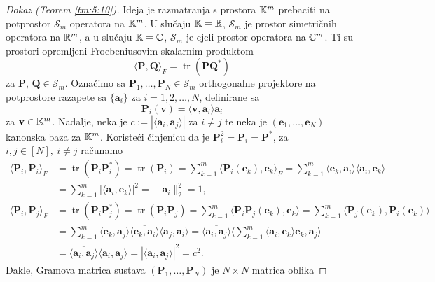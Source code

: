 \documentclass[a4paper,twoside,12pt]{memoir} %
\newcommand{\vect}[1]{\mathbf{#1}}
\renewcommand{\vec}{\vect}
\newcommand{\norm}[1]{\|{#1}\|}
\DeclareMathOperator{\tr}{tr}
\begin{document}
\begin{proof}[Dokaz (Teorem \ref{tm:5:10})]
    Ideja je razmatranja s prostora $\mathbb{K}^m$ prebaciti na potprostor $\mathcal{S}_m$ operatora na $\mathbb{K}^m$. U slu\v{c}aju $\mathbb{K} = \mathbb{R}$, $\mathcal{S}_m$ je prostor simetri\v{c}nih operatora na $\mathbb{R}^m$, a u slu\v{c}aju $\mathbb{K} = \mathbb{C}$, $\mathcal{S}_m$ je cjeli prostor operatora na $\mathbb{C}^m$. Ti su prostori opremljeni Froebeniusovim skalarnim produktom
    \begin{equation}
        \langle \vec P, \vec Q \rangle_F = \tr(\vec{PQ}^*) 
    \end{equation}
    za $\vec P$, $\vec Q \in \mathcal{S}_m$.
    Ozna\v{c}imo sa $\vec P_1, \dots, \vec P_N \in \mathcal{S}_m$ orthogonalne projektore na potprostore razapete sa $\{\vec a_i\}$ za $i=1,2,\dots,N$, definirane sa
    \begin{equation*}
        \vec P_i(\vec v) = \langle \vec v, \vec a_i \rangle \vec a_i
    \end{equation*}
    za $\vec v \in \K^m$. Nadalje, neka je $c:=|\langle \vec a_i, \vec a_j \rangle|$ za $i \neq j$ te neka je $(\vec e_1, \dots, \vec e_N)$ kanonska baza za $\mathbb{K}^m$. Koriste\'ci \v{c}injenicu da je $\vec P_i^2 = \vec P_i = \vec P^*$, za $i,j \in [N],\ i \neq j$ ra\v{c}unamo
    \begin{align*}
        \langle \vec P_i, \vec P_i \rangle_F &= \tr(\vec P_i \vec P_i^*) = \tr(\vec P_i) = \sum_{k=1}^{m} \langle \vec P_i(\vec e_k), \vec e_k \rangle_F = \sum_{k=1}^{m} \langle \vec e_k, \vec a_i \rangle \langle \vec a_i, \vec e_k \rangle \\
    &= \sum_{k=1}^m |\langle \vec a_i, \vec e_k \rangle|^2 = \norm{\vec a_i}_2^2 = 1, \\
        \langle \vec P_i, \vec P_j \rangle_F &= \tr(\vec P_i \vec P_j^*) = \tr(\vec P_i \vec P_j) = \sum_{k=1}^m \langle \vec P_i \vec P_j (\vec e_k), \vec e_k \rangle = \sum_{k=1}^m \langle \vec P_j(\vec e_k), \vec P_i(\vec e_k) \rangle \\
        &= \sum_{k=1}^m \langle \vec e_k, \vec a_j \rangle \overline{\langle \vec e_k, \vec a_i \rangle}\langle \vec a_j, \vec a_i \rangle = \overline{\langle \vec a_i, \vec a_j \rangle} \big \langle \sum_{k=1}^m \langle \vec a_i, \vec e_k \rangle \vec e_k, \vec a_j  \big \rangle\\
        &= \overline{\langle \vec a_i, \vec a_j \rangle} \langle \vec a_i, \vec a_j \rangle = |\langle \vec a_i, \vec a_j \rangle|^2 = c^2.
    \end{align*}
    Dakle, Gramova matrica sustava $(\vec P_1, \dots, \vec P_N)$ je $N \times N$ matrica oblika

\end{proof}
\end{document}
